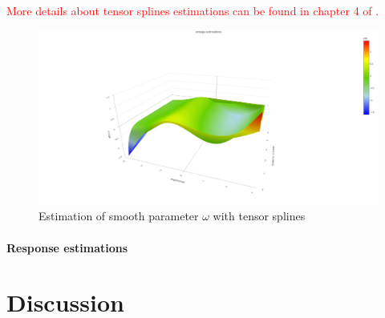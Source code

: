 \documentclass[11pt]{article}
\newcommand {\1}{\mathbb{1}}
\begin{document}
\textcolor{red}{More details about tensor splines estimations can be found in chapter 4 of \cite{wood_generalized_2017}.}

\begin{figure}[H]
	\centering
	\includegraphics[width=0.7\linewidth]{images/constrained_models/omega_estimations}
	\caption{Estimation of smooth parameter $\omega$ with tensor splines}
	\label{fig:omegaestimations}
\end{figure}



\paragraph{Response estimations}

\section{Discussion}
\end{document}
